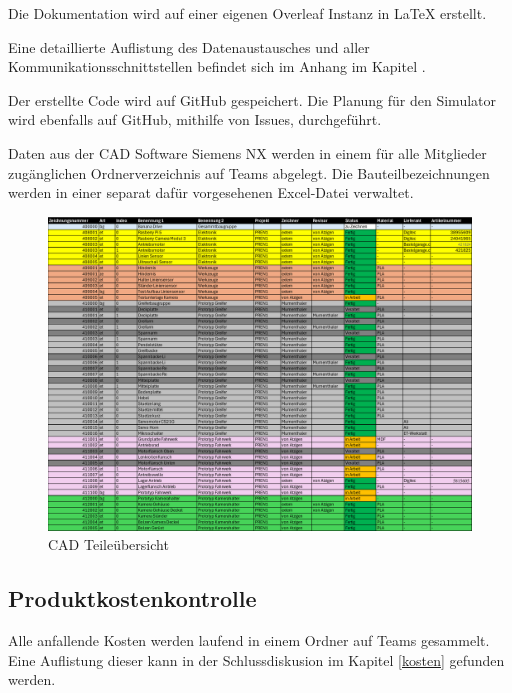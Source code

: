 Die Dokumentation wird auf einer eigenen Overleaf Instanz in LaTeX erstellt.

Eine detaillierte Auflistung des Datenaustausches und aller Kommunikationsschnittstellen befindet sich im Anhang im Kapitel .

Der erstellte Code wird auf GitHub gespeichert. Die Planung für den Simulator wird ebenfalls auf GitHub, mithilfe von Issues, durchgeführt. 

Daten aus der CAD Software Siemens NX werden in einem für alle Mitglieder zugänglichen Ordnerverzeichnis auf Teams abgelegt. Die Bauteilbezeichnungen werden in einer separat dafür vorgesehenen Excel-Datei verwaltet. 

\begin{figure}[H]
\centering
\includegraphics[width=\textwidth]{img/00_Teileuebersicht.pdf}
\caption{CAD Teileübersicht}
\label{CAD-Teileuebersicht}
\end{figure}


\subsection{Produktkostenkontrolle}

Alle anfallende Kosten werden laufend in einem Ordner auf Teams gesammelt. Eine Auflistung dieser kann in der Schlussdiskusion im Kapitel \ref{kosten} gefunden werden.

